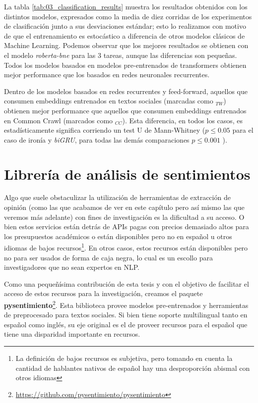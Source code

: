 La tabla \ref{tab:03_classification_results} muestra los resultados obtenidos con los distintos modelos, expresados como la media de diez corridas de los experimentos de clasificación junto a sus desviaciones estándar; esto lo realizamos con motivo de que el entrenamiento es estocástico a diferencia de otros modelos clásicos de Machine Learning. Podemos observar que los mejores resultados se obtienen con el modelo \emph{roberta-bne} para las 3 tareas, aunque las diferencias son pequeñas. Todos los modelos basados en modelos pre-entrenados de transformers obtienen mejor performance que los basados en redes neuronales recurrentes.

Dentro de los modelos basados en redes recurrentes y feed-forward, aquellos que consumen embeddings entrenados en textos sociales (marcadas como $_{TW}$) obtienen mejor performance que aquellos que consumen embeddings entrenados en Common Crawl (marcados como $_{CC}$). Esta diferencia, en todos los casos, es estadísticamente significa corriendo un test U de Mann-Whitney ($p \leq 0.05$ para el caso de ironía y \emph{biGRU}, para todas las demás comparaciones $p \leq 0.001$ ).




\section{Librería de análisis de sentimientos}

\newcommand{\pysentimiento}[0]{\textbf{pysentimiento}}

Algo que suele obstaculizar la utilización de herramientas de extracción de opinión (como las que acabamos de ver en este capítulo pero así mismo las que veremos más adelante) con fines de investigación es la dificultad a su acceso. O bien estos servicios están detrás de APIs pagas con precios demasiado altos para los presupuestos académicos o están disponibles pero no en español u otros idiomas de bajos recursos\footnote{La definición de bajos recursos es subjetiva, pero tomando en cuenta la cantidad de hablantes nativos de español hay una desproporción abismal con otros idiomas}. En otros casos, estos recursos están disponibles pero no para ser usados de forma de caja negra, lo cual es un escollo para investigadores que no sean expertos en NLP.

Como una pequeñísima contribución de esta tesis y con el objetivo de facilitar el acceso de estos recursos para la investigación, creamos el paquete \textbf{pysentimiento}\footnote{\url{https://github.com/pysentimiento/pysentimiento}}. Esta biblioteca provee modelos pre-entrenados y herramientas de preprocesado para textos sociales. Si bien tiene soporte multilingual tanto en español como inglés, su eje original es el de proveer recursos para el español que tiene una disparidad importante en recursos.

